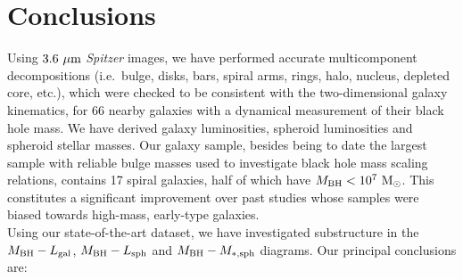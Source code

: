 \documentclass[preprint2]{emulateapj}
\begin{document}
\section{Conclusions}
Using $3.6\rm~\mu m$ \emph{Spitzer} images, 
we have performed accurate multicomponent decompositions (i.e.~bulge, disks, bars, spiral arms, rings, halo, nucleus, depleted core, etc.), 
which were checked to be consistent with the two-dimensional galaxy kinematics, 
for 66 nearby galaxies with a dynamical measurement of their black hole mass.
We have derived galaxy luminosities, spheroid luminosities and spheroid stellar masses. 
Our galaxy sample, besides being to date the largest sample with reliable bulge masses used to investigate black hole mass scaling relations, 
contains 17 spiral galaxies, half of which have $M_{\rm BH} < 10^7 \rm~M_{\odot}$. 
This constitutes a significant improvement over past studies whose samples were biased towards high-mass, early-type galaxies. \\
Using our state-of-the-art dataset, we have investigated substructure in the $M_{\rm BH} - L_{\rm gal}$, $M_{\rm BH} - L_{\rm sph}$ 
and $M_{\rm BH} - M_{\rm *,sph}$ diagrams. 
Our principal conclusions are: \\
\end{document}
